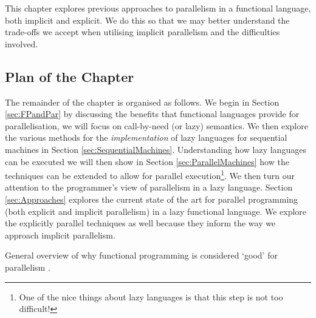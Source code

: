 This chapter explores previous approaches to parallelism in a
functional language, both implicit and explicit. We do this so that
we may better understand the trade-offs we accept when utilising
implicit parallelism and the difficulties involved.

\subsection*{Plan of the Chapter}

The remainder of the chapter is organised as follows. We begin in Section
\ref{sec:FPandPar} by discussing the benefits that functional languages provide
for parallelisation, we will focus on call-by-need (or lazy) semantics. We then
explore the various methods for the \emph{implementation} of lazy languages for
sequential machines in Section \ref{sec:SequentialMachines}. Understanding how
lazy languages can be executed we will then show in Section
\ref{sec:ParallelMachines} how the techniques can be extended to allow for
parallel execution\footnote{One of the nice things about lazy languages is that
this step is not too difficult!}. We then turn our attention to the
programmer's view of parallelism in a lazy language. Section
\ref{sec:Approaches} explores the current state of the art for parallel
programming (both explicit and implicit parallelism) in a lazy functional
language. We explore the explicitly parallel techniques as well because they
inform the way we approach implicit parallelism.


General overview of why functional programming is considered `good' for
parallelism \citep{hughes:thesis}.
